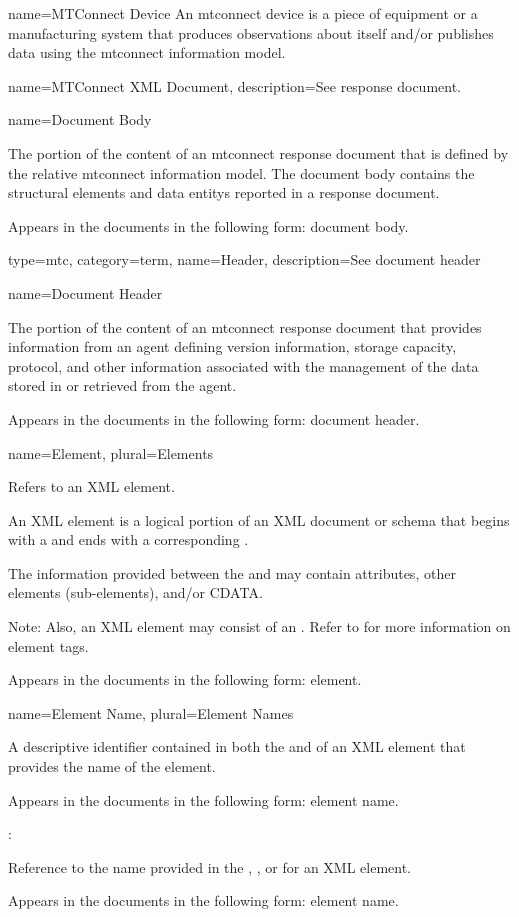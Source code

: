 {
  name={MTConnect Device}
}
{
	An \gls{mtconnect device} is a piece of equipment or a manufacturing system that produces \glspl{observation} about itself and/or publishes data using the \gls{mtconnect information model}.
}


{
  name={MTConnect XML Document},
  description={See \gls{response document}.}
}


{
  name={Document Body}
}
{
	The portion of the content of an \gls{mtconnect response document} that is defined by the relative \gls{mtconnect information model}. The \gls{document body} contains the \glspl{structural element} and \glspl{data entity} reported in a \gls{response document}.

	Appears in the documents in the following form: \gls{document body}.
}

{
  type=mtc,
  category=term,
  name={Header},
  description={See \gls{document header}}
}


{
  name={Document Header}
}
{
	The portion of the content of an \gls{mtconnect response document} that provides information from an \gls{agent} defining version information, storage capacity, protocol, and other information associated with the management of the data stored in or retrieved from the \gls{agent}.
	
	Appears in the documents in the following form: \gls{document header}.
}


{
  name={Element},
  plural={Elements}
}
{
	Refers to an XML element.

	An XML element is a logical portion of an XML document or schema that begins with a  and ends with a corresponding .  

	The information provided between the  and  may contain attributes, other elements (sub-elements), and/or CDATA.

    \begin{note}
	Note:  Also, an XML element may consist of an .  Refer to  for more information on element tags.
    \end{note}
    
	Appears in the documents in the following form: element.
}


{
  name={Element Name},
  plural={Element Names}
}
{
	A descriptive identifier contained in both the  and  of an XML element that provides the name of the element.

	Appears in the documents in the following form: element name.

	:

	Reference to the name provided in the , , or  for an XML element.

	Appears in the documents in the following form: \gls{element name}.
}


